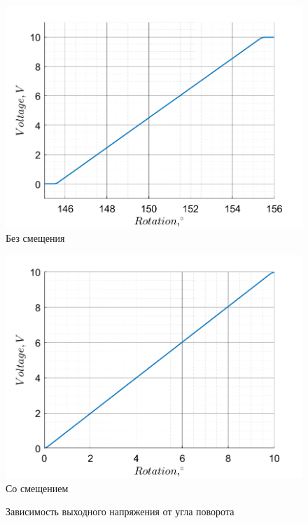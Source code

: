 \begin{figure}[!h]
    \centering
    \begin{minipage}{0.5\textwidth}
        \centering
        \includegraphics[width = 1\textwidth]{img/img_6}
        Без смещения
        \label{fig:img/img_5}
    \end{minipage}%
\begin{minipage}{0.5\textwidth}
        \centering
        \includegraphics[width = 1\textwidth]{img/img_7}
        Со смещением
        \label{fig:img/img_7}
    \end{minipage}%
    \caption{Зависимость выходного напряжения от угла поворота}
\end{figure}

